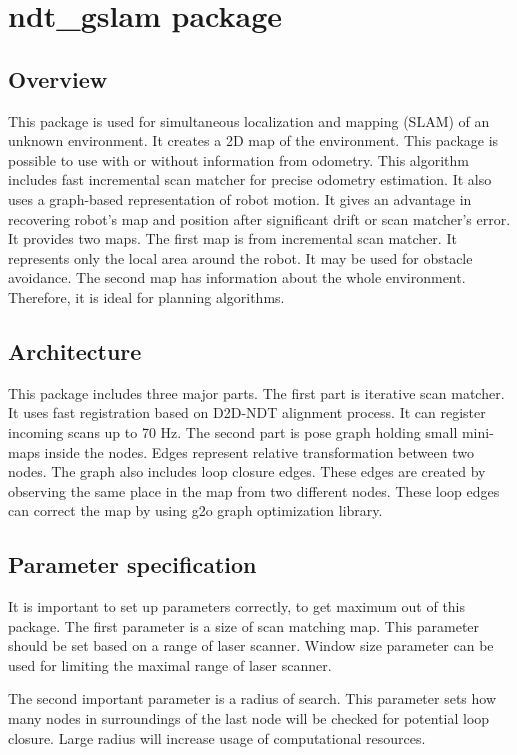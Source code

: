 \chapter{ndt\_gslam package}
\label{chap:ndt_gslam_package}
\section{Overview}
This package is used for simultaneous localization and mapping (SLAM) of an unknown environment. It creates a 2D map of the environment. This package is possible to use with or without information from odometry. This algorithm includes fast incremental scan matcher for precise odometry estimation. It also uses a graph-based representation of robot motion. It gives an advantage in recovering robot's map and position after significant drift or scan matcher's error. It provides two maps. The first map is from incremental scan matcher.  It represents only the local area around the robot. It may be used for obstacle avoidance. The second map has information about the whole environment. Therefore, it is ideal for planning algorithms.  

\section{Architecture}
This package includes three major parts. The first part is iterative scan matcher. It uses fast registration based on D2D-NDT alignment process. It can register incoming scans up to 70 Hz. The second part is pose graph holding small mini-maps inside the nodes. Edges represent relative transformation between two nodes. The graph also includes loop closure edges. These edges are created by observing the same place in the map from two different nodes. These loop edges can correct the map by using g2o graph optimization library.

\section{Parameter specification}
It is important to set up parameters correctly, to get maximum out of this package. The first parameter is a size of scan matching map. This parameter should be set based on a range of laser scanner.  Window size parameter can be used for limiting the maximal range of laser scanner. 

The second important parameter is a radius of search. This parameter sets how many nodes in surroundings of the last node will be checked for potential loop closure.  Large radius will increase usage of computational resources.  

